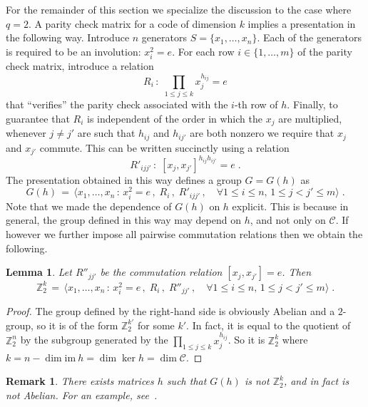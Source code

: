 \documentclass[11pt]{article}
\newtheorem{lemma}[theorem]{Lemma}
\newtheorem{remark}[theorem]{Remark}
\theoremstyle{definition}
\newcommand{\Z}{\ensuremath{\mathbb{Z}}}
\newcommand{\mC}{\ensuremath{\mathcal{C}}}
\begin{document}
For the remainder of this section we specialize the discussion to the case where $q=2$. 
A parity check matrix for a code of dimension $k$ implies a presentation in the following way. Introduce $n$ generators $S=\{x_1,\ldots,x_n\}$. Each of the generators is required to be an involution: $x_i^2=e$. For each row $i\in \{1,\ldots,m\}$ of the parity check matrix, introduce a relation 
\[ R_i\,:\; \prod_{1\leq j \leq k} x_j^{h_{ij}}=e \]
that ``verifies'' the parity check associated with the $i$-th row of $h$. Finally, to guarantee that $R_i$ is independent of the order in which the $x_j$ are multiplied, whenever $j\neq j'$ are such that $h_{ij}$ and $h_{ij'}$ are both nonzero we require that $x_j$ and $x_{j'}$ commute. This can be written succinctly using a relation 
\[ R'_{ijj'}\,:\; [x_j,x_{j'}]^{h_{ij} h_{ij'}}=e\;.\]
The presentation obtained in this way defines a group $G=G(h)$ as 
\begin{equation}\label{eq:def-gh-pres}
 G(h) \,=\, \big\langle x_1,\ldots,x_n \,:\, x_i^2=e\,,\; R_i\,,\; R'_{ijj'}\,,\quad \forall 1\leq i\leq n,\, 1\leq j< j' \leq m\big\rangle\;.
\end{equation}
Note that we made the dependence of $G(h)$ on $h$ explicit. This is because in general, the group defined in this way may depend on $h$, and not only on $\mC$. If however we further impose all pairwise commutation relations then we obtain the following. 

\begin{lemma}\label{lem:com-code}
Let $R''_{jj'}$ be the commutation relation $[x_j,x_{j'}]=e$. Then
\[ \Z_2^k \,=\, \big\langle x_1,\ldots,x_n \,:\, x_i^2=e\,,\; R_i\,,\; R''_{jj'}\,,\quad \forall 1\leq i\leq n,\, 1\leq j< j' \leq m\big\rangle\;.\]
\end{lemma}

\begin{proof}
The group defined by the right-hand side is obviously Abelian and a $2$-group, so it is of the form $\Z_2^{k'}$ for some $k'$. In fact, it is equal to the quotient of $\Z_2^n$ by the subgroup generated by the $\prod_{1\leq j \leq k} x_j^{h_{ij}}$. So it is $\Z_2^k$ where $k=n-\dim\textrm{im}\ h = \dim\ker h=\dim \mC$.  
\end{proof}

\begin{remark}
There exists matrices $h$ such that $G(h)$ is not $\Z_2^k$, and in fact is not Abelian. For an example, see~\cite[Example 2.16]{paddock2022arkhipov}.  
\end{remark}
\end{document}
